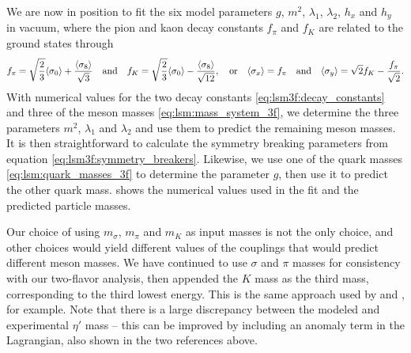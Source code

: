 We are now in position to fit the six model parameters $g$, $m^2$, $\lambda_1$, $\lambda_2$, $h_x$ and $h_y$ in vacuum,
where the pion and kaon decay constants $f_\pi$ and $f_K$ are related to the ground states through
\cite{ref:lsm3f_details}
\begin{equation}
	f_\pi = \sqrt{\frac23} \langle \sigma_0 \rangle + \frac{\langle \sigma_8 \rangle}{\sqrt{3}}
	\quad \text{and} \quad
	f_K = \sqrt{\frac23} \langle \sigma_0 \rangle - \frac{\langle \sigma_8 \rangle}{\sqrt{12}},
	\quad \text{or} \quad
	\langle \sigma_x \rangle = f_\pi
	\quad \text{and} \quad
	\langle \sigma_y \rangle = \sqrt{2} f_K - \frac{f_\pi}{\sqrt{2}}.
\label{eq:lsm3f:decay_constants}
\end{equation}
With numerical values for the two decay constants \eqref{eq:lsm3f:decay_constants} and three of the meson masses \eqref{eq:lsm:mass_system_3f},
we determine the three parameters $m^2$, $\lambda_1$ and $\lambda_2$ and use them to predict the remaining meson masses.
It is then straightforward to calculate the symmetry breaking parameters from equation \eqref{eq:lsm3f:symmetry_breakers}.
Likewise, we use one of the quark masses \eqref{eq:lsm:quark_masses_3f} to determine the parameter $g$, then use it to predict the other quark mass.
 shows the numerical values used in the fit and the predicted particle masses.

Our choice of using $m_\sigma$, $m_\pi$ and $m_K$ as input masses is not the only choice, and other choices would yield different values of the couplings that would predict different meson masses.
We have continued to use $\sigma$ and $\pi$ masses for consistency with our two-flavor analysis, then appended the $K$ mass as the third mass, corresponding to the third lowest energy.
This is the same approach used by \cite{ref:lsm3f} and \cite{ref:lsm3f_details}, for example.
Note that there is a large discrepancy between the modeled and experimental $\eta'$ mass -- this can be improved by including an anomaly term in the Lagrangian, also shown in the two references above.

